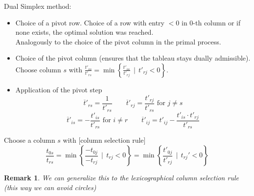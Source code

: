 \documentclass[a4paper]{article}
\numberwithin{lecref}{subsection}
\newtheorem*{Remark}{Remark}
\newcommand{\SetDef}[2]{\left\{#1\,\mid\,#2\right\}}
\begin{document}
Dual Simplex method:
\begin{itemize}
	\item Choice of a pivot row. Choice of a row with entry $< 0$ in 0-th column or if none exists, the optimal solution was reached. \\
		  Analogously to the choice of the pivot column in the primal process.
	\item Choice of the pivot column (ensures that the tableau stays dually admissible). \\
		  Choose column $s$ with $\frac{t'_{os}}{t'_{rs}} = \min\SetDef{\frac{t'_{os}}{t'_{rj}}}{t'_{rj} < 0}$.
	\item Application of the pivot step
		  \[ \overline{t}'_{rs} = \frac{1}{t'_{rs}} \qquad \overline{t}'_{rj} = \frac{t'_{rj}}{t'_{rs}} \text{ for } j \neq s \]
		  \[ \overline{t}'_{is} = -\frac{t'_{is}}{t'_{rs}} \text{ for } i \neq r \qquad \overline{t}'_{ij} = t'_{ij} - \frac{t'_{is} \cdot t'_{rj}}{t'_{rs}} \]
\end{itemize}

Choose a column $s$ with [column selection rule]
\[ \frac{t_{0s}}{t_{rs}} = \min\SetDef{\frac{-t_{0j}}{-t_{rj}}}{t_{rj} < 0} = \min\SetDef{\frac{t'_{0j}}{t'_{rj}}}{t_{rj}' < 0} \]

\begin{Remark}
	We can generalize this to the lexicographical column selection rule (this way we can avoid circles)
\end{Remark}
\end{document}
